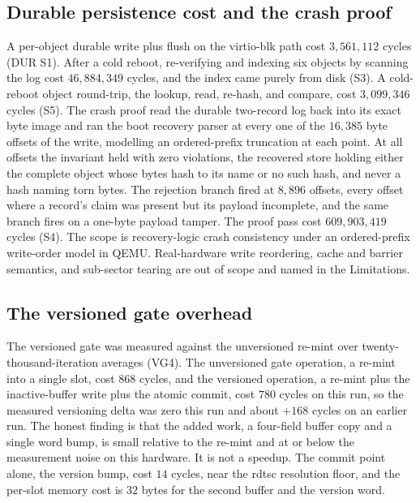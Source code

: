 \documentclass[10pt,twocolumn]{article}
\begin{document}
\subsection{Durable persistence cost and the crash proof}

A per-object durable write plus flush on the virtio-blk path cost $3{,}561{,}112$
cycles (DUR S1). After a cold reboot, re-verifying and indexing six objects by
scanning the log cost $46{,}884{,}349$ cycles, and the index came purely from
disk (S3). A cold-reboot object round-trip, the lookup, read, re-hash, and
compare, cost $3{,}099{,}346$ cycles (S5). The crash proof read the durable
two-record log back into its exact byte image and ran the boot recovery parser at
every one of the $16{,}385$ byte offsets of the write, modelling an ordered-prefix
truncation at each point. At all offsets the invariant held with zero violations,
the recovered store holding either the complete object whose bytes hash to its
name or no such hash, and never a hash naming torn bytes. The rejection branch
fired at $8{,}896$ offsets, every offset where a record's claim was present but its
payload incomplete, and the same branch fires on a one-byte payload tamper. The
proof pass cost $609{,}903{,}419$ cycles (S4). The scope is recovery-logic crash
consistency under an ordered-prefix write-order model in QEMU. Real-hardware write
reordering, cache and barrier semantics, and sub-sector tearing are out of scope
and named in the Limitations.

\subsection{The versioned gate overhead}

The versioned gate was measured against the unversioned re-mint over
twenty-thousand-iteration averages (VG4). The unversioned gate operation, a
re-mint into a single slot, cost $868$ cycles, and the versioned operation, a
re-mint plus the inactive-buffer write plus the atomic commit, cost $780$ cycles
on this run, so the measured versioning delta was zero this run and about $+168$
cycles on an earlier run. The honest finding is that the added work, a four-field
buffer copy and a single word bump, is small relative to the re-mint and at or
below the measurement noise on this hardware. It is not a speedup. The commit
point alone, the version bump, cost $14$ cycles, near the rdtsc resolution floor,
and the per-slot memory cost is $32$ bytes for the second buffer and the version
word.
\end{document}

